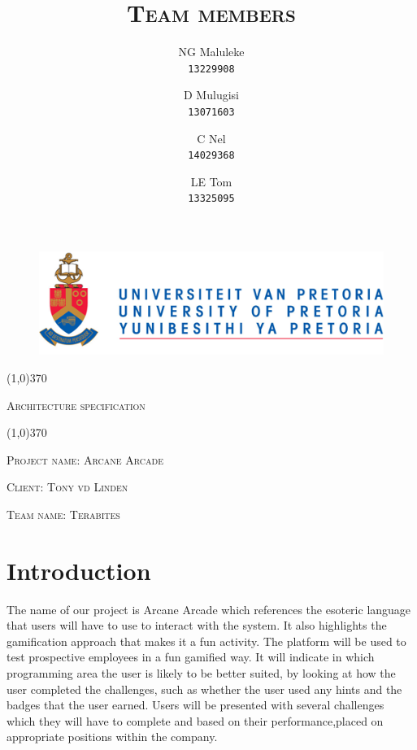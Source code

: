 \documentclass[english]{article}
\title{\scshape\Large Team members}
\author{
	NG Maluleke\\
	\texttt{13229908}
	\and
	D Mulugisi\\
	\texttt{13071603}
	\and
	C Nel\\
	\texttt{14029368}
	\and
	LE Tom\\
	\texttt{13325095}
}
\begin{document}
	
	\begin{figure}
	      \includegraphics[width=\linewidth]{up_logo.png}
	\end{figure}
	
	\begin{center}
	 \line(1,0){370}
	\\[0.2cm]
    {\scshape\Large Architecture specification \par}
	\vspace{0.1cm}
	\line(1,0){370}
	\\[0.8cm]
	
	{\scshape\large Project name: Arcane Arcade\par}	
	\vspace{1cm}
	{\scshape\large Client: Tony vd Linden\par}
	\vspace{1cm}
	{\scshape\large Team name: Terabites\par}
	\vspace{1cm}
	{\let\newpage\relax\maketitle}
	\end{center}
	
	
	\newpage
	\tableofcontents

	\newpage
	
	\section{Introduction}
	The name of our project is Arcane Arcade which references the esoteric language that users will have to use to interact with the system. It also highlights the gamification approach that makes it a fun activity. The platform will be used to test prospective employees in a fun gamified way. It will indicate in which programming area the user is likely to be better suited, by looking at how the user completed the challenges, such as whether the user used any hints and the badges that the user earned. Users will be presented with several challenges which they will have to complete and based on their performance,placed on appropriate positions within the company.
	
\end{document}
